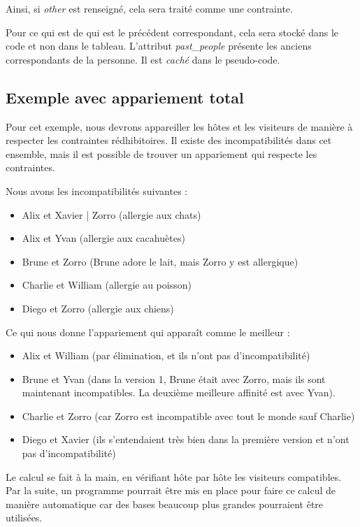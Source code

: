 \documentclass{mytex}
\begin{document}
Ainsi, si \textit{other} est renseigné, cela sera traité comme une contrainte.

Pour ce qui est de qui est le précédent correspondant, cela sera stocké dans le code et non dans le tableau.
L'attribut \textit{past\_people} présente les anciens correspondants de la personne. Il est \textit{caché} dans le pseudo-code.

\subsection{Exemple avec appariement total}

Pour cet exemple, nous devrons appareiller les hôtes et les visiteurs de manière à respecter les contraintes rédhibitoires.
Il existe des incompatibilités dans cet ensemble, mais il est possible de trouver un appariement qui respecte les contraintes.

Nous avons les incompatibilités suivantes :
\begin{itemize}
    \item Alix et Xavier | Zorro (allergie aux chats)
    \item Alix et Yvan (allergie aux cacahuètes)
    \item Brune et Zorro (Brune adore le lait, mais Zorro y est allergique)
    \item Charlie et William (allergie au poisson)
    \item Diego et Zorro (allergie aux chiens)
\end{itemize}

Ce qui nous donne l'appariement qui apparaît comme le meilleur :

\begin{itemize}
    \item Alix et William (par élimination, et ils n'ont pas d'incompatibilité)
    \item Brune et Yvan (dans la version 1, Brune était avec Zorro, mais ils sont maintenant incompatibles. La deuxième meilleure affinité est avec Yvan).
    \item Charlie et Zorro (car Zorro est incompatible avec tout le monde sauf Charlie)
    \item Diego et Xavier (ils s'entendaient très bien dans la première version et n'ont pas d'incompatibilité)
\end{itemize}

Le calcul se fait à la main, en vérifiant hôte par hôte les visiteurs compatibles.
Par la suite, un programme pourrait être mis en place pour faire ce calcul de manière automatique car des bases beaucoup plus grandes pourraient être utilisées.
\end{document}
